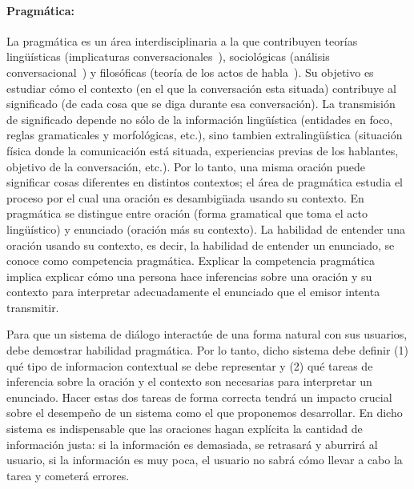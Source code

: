 \paragraph{Pragm\'atica:} La pragm\'atica es un \'area interdisciplinaria a
la que contribuyen teor\'ias ling\"u\'isticas (implicaturas
conversacionales~\citep{grice75}), sociol\'ogicas (an\'alisis
conversa\-cio\-nal~\citep{schegloff87b}) y filos\'oficas (teor\'ia de los actos
de habla~\citep{austin62}). Su objetivo es estudiar c\'omo el contexto (en el
que la conversaci\'on esta situada) contribuye al significado (de cada cosa que
se diga durante esa conversaci\'on). La transmisi\'on de significado depende no
s\'olo de la informaci\'on ling\"u\'istica (entidades en foco, reglas
gramaticales y morfol\'ogicas, etc.), sino tambien extraling\"u\'istica
(situaci\'on f\'isica donde la comunicaci\'on est\'a situada, experiencias
previas de los hablantes, objetivo de la conversaci\'on, etc.). Por lo tanto,
una misma oraci\'on puede significar cosas diferentes en distintos contextos; el
\'area de pragm\'atica estudia el proceso por el cual una oraci\'on es
desambig\"uada usando su contexto. En pragm\'atica se distingue entre oraci\'on
(forma gramatical que toma el acto ling\"u\'istico) y enunciado (oraci\'on m\'as su
contexto). La habilidad de entender una oraci\'on usando su contexto, es decir,
la habilidad de entender un enunciado, se conoce como competencia pragm\'atica.
Explicar la competencia pragm\'atica implica explicar c\'omo una persona hace
inferencias sobre una oraci\'on y su contexto para interpretar adecuadamente el
enunciado que el emisor intenta transmitir. 

Para que un sistema de di\'alogo interact\'ue de una forma natural con sus
usuarios, debe demostrar habilidad pragm\'atica. Por lo tanto, dicho sistema
debe definir (1) qu\'e tipo de informacion contextual se debe representar y (2)
qu\'e tareas de inferencia sobre la oraci\'on y el contexto son necesarias para
interpretar un enunciado. Hacer estas dos tareas de forma correcta tendr\'a un
impacto crucial sobre el desempe\~no de un sistema como el que proponemos
desarrollar. En dicho sistema es indispensable que las oraciones hagan
expl\'icita la cantidad de informaci\'on justa: si la informaci\'on es
demasiada, se retrasar\'a y aburrir\'a al usuario, si la informaci\'on es muy
poca, el usuario no sabr\'a c\'omo llevar a cabo la tarea y cometer\'a errores. 

%
%

